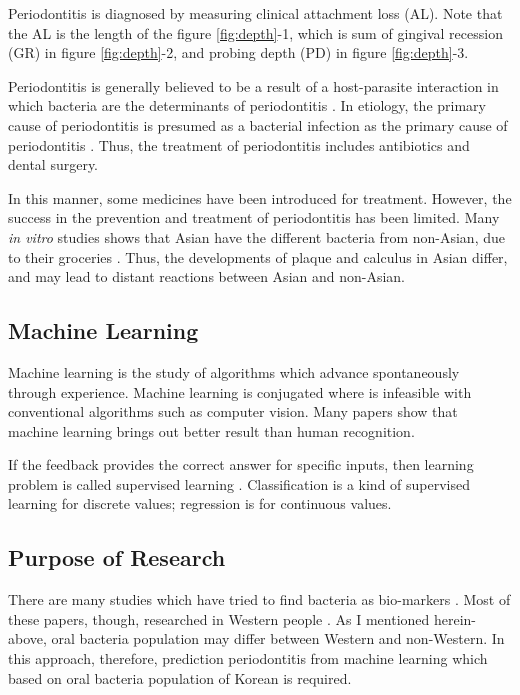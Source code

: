 \documentclass[11pt, a4paper]{article}
\begin{document}
    		Periodontitis is diagnosed by measuring clinical attachment loss (AL). Note that the AL is the length of the figure \ref{fig:depth}-1, which is sum of gingival recession (GR) in figure \ref{fig:depth}-2, and probing depth (PD) in figure \ref{fig:depth}-3.
    		
    		Periodontitis is generally believed to be a result of a host-parasite interaction in which bacteria are the determinants of periodontitis \cite{ref:cause1}. In etiology, the primary cause of periodontitis is presumed as a bacterial infection as the primary cause of periodontitis \cite{ref:perio1}. Thus, the treatment of periodontitis includes antibiotics and dental surgery.
    		
    		In this manner, some medicines have been introduced for treatment. However, the success in the prevention and treatment of periodontitis has been limited. Many \textit{in vitro} studies shows that Asian have the different bacteria from non-Asian, due to their groceries \cite{ref:asian1}. Thus, the developments of plaque and calculus in Asian differ, and may lead to distant reactions between Asian and non-Asian.
    		
    	\subsection{Machine Learning}
    		Machine learning is the study of algorithms which advance spontaneously through experience. Machine learning is conjugated where is infeasible with conventional algorithms such as computer vision.  Many papers show that machine learning brings out better result than human recognition. 
    	
    		If the feedback provides the correct answer for specific inputs, then learning problem is called supervised learning \cite{ref:ai1}. Classification is a kind of supervised learning for discrete values; regression is for continuous values.
    		
    	\subsection{Purpose of Research}
    		There are many studies which have tried to find bacteria as bio-markers \cite{ref:biomarker1, ref:biomarker2}. Most of these papers, though, researched in Western people \cite{ref:west1, ref:west2}. As I mentioned herein-above, oral bacteria population may differ between Western and non-Western. In this approach, therefore, prediction periodontitis from machine learning which based on oral bacteria population of Korean is required. 
    		
\end{document}
